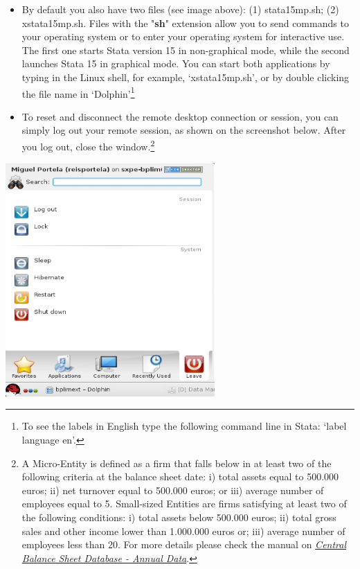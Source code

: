 \documentclass[]{book}
\let\rmarkdownfootnote\footnote%
\def\footnote{\protect\rmarkdownfootnote}
\begin{document}
\begin{itemize}
\item
  By default you also have two files (see image above): (1)
  stata15mp.sh; (2) xstata15mp.sh. Files with the
  "\textbf{{sh}}" extension allow you to send commands to
  your operating system or to enter your operating system for
  interactive use. The first one starts Stata version 15 in
  non-graphical mode, while the second launches Stata 15 in
  graphical mode. You can start both applications by typing in the
  Linux shell, for example, `xstata15mp.sh', or by double clicking
  the file name in `Dolphin'\footnote{To see the labels in English type the following command line in Stata: `label language en'.}
\item
  To reset and disconnect the remote desktop connection or session,
  you can simply log out your remote session, as shown on the
  screenshot below. After you log out, close the window.\footnote{A Micro-Entity is defined as a firm that falls below in at least two of the following criteria at the balance sheet date: i) total assets equal to 500.000 euros; ii) net turnover equal to 500.000 euros; or iii) average number of employees equal to 5. Small-sized Entities are firms satisfying at least two of the following conditions: i) total assets below 500.000 euros; ii) total gross sales and other income lower than 1.000.000 euros or; iii) average number of employees less than 20. For more details please check the manual on \href{../../CB/Jun2018/Pack_CB_Empresas_Jun18/manual_CB_Jun2018.html}{\emph{Central Balance Sheet Database - Annual Data}}.}
\end{itemize}

\includegraphics[width=3.14961in,height=3.50521in]{./media/image7.png}
\end{document}
